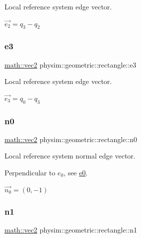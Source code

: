 Local reference system edge vector. 

$\vec{e_2} = q_3 - q_2$ \mbox{\label{classphysim_1_1geometric_1_1rectangle_a94e615cbf893ff4950e845545796c779}} 
\subsubsection{\texorpdfstring{e3}{e3}}
{\footnotesize\ttfamily \hyperlink{structphysim_1_1math_1_1vec2}{math\+::vec2} physim\+::geometric\+::rectangle\+::e3\hspace{0.3cm}{\ttfamily [private]}}



Local reference system edge vector. 

$\vec{e_3} = q_0 - q_3$ \mbox{\label{classphysim_1_1geometric_1_1rectangle_a1515a4ffb5dd7bcd8ddc0fbda9eb6564}} 
\subsubsection{\texorpdfstring{n0}{n0}}
{\footnotesize\ttfamily \hyperlink{structphysim_1_1math_1_1vec2}{math\+::vec2} physim\+::geometric\+::rectangle\+::n0\hspace{0.3cm}{\ttfamily [private]}}



Local reference system normal edge vector. 

Perpendicular to $e_0$, see \hyperlink{classphysim_1_1geometric_1_1rectangle_a70d4839212717247ae294f94cd7de372}{e0}.

$\vec{n_0} = (0,-1)$ \mbox{\label{classphysim_1_1geometric_1_1rectangle_a3d075b4865232e66ff9e6d3d60970e1e}} 
\subsubsection{\texorpdfstring{n1}{n1}}
{\footnotesize\ttfamily \hyperlink{structphysim_1_1math_1_1vec2}{math\+::vec2} physim\+::geometric\+::rectangle\+::n1\hspace{0.3cm}{\ttfamily [private]}}



